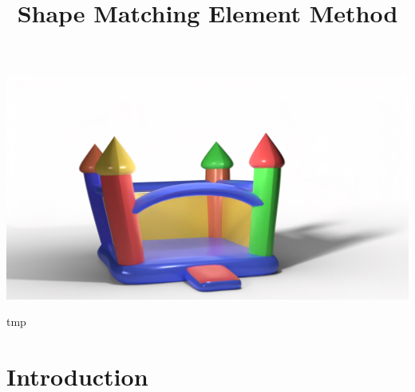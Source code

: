 \documentclass[sigconf]{acmart}
\begin{document}
\title{Shape Matching Element Method}

\begin{teaserfigure}
  \includegraphics[width=\textwidth]{castle.png}
  \caption{tmp}
  \Description{}
  \label{fig:teaser}
\end{teaserfigure}

\maketitle

\section{Introduction}
\end{document}
